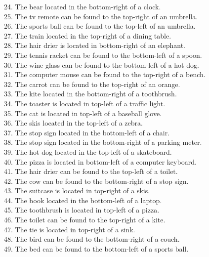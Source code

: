 \begin{figure}[t]
{\begin{minipage}{0.96\textwidth}
\begin{minipage}[t]{0.48\textwidth}
24. The bear located in the bottom-right of a clock.\\
25. The tv remote can be found to the top-right of an umbrella.\\
26. The sports ball can be found to the top-left of an umbrella.\\
27. The train located in the top-right of a dining table.\\
28. The hair drier is located in bottom-right of an elephant.\\
29. The tennis racket can be found to the bottom-left of a spoon.\\
30. The wine glass can be found to the bottom-left of a hot dog.\\
31. The computer mouse can be found to the top-right of a bench.\\
32. The carrot can be found to the top-right of an orange.\\
33. The kite located in the bottom-right of a toothbrush.\\
34. The toaster is located in top-left of a traffic light.\\
35. The cat is located in top-left of a baseball glove.\\
36. The skis located in the top-left of a zebra.\\
37. The stop sign located in the bottom-left of a chair.\\
38. The stop sign located in the bottom-right of a parking meter.\\
39. The hot dog located in the top-left of a skateboard.\\
40. The pizza is located in bottom-left of a computer keyboard.\\
41. The hair drier can be found to the top-left of a toilet.\\
42. The cow can be found to the bottom-right of a stop sign.\\
43. The suitcase is located in top-right of a skis.\\
44. The book located in the bottom-left of a laptop.\\
45. The toothbrush is located in top-left of a pizza.\\
46. The toilet can be found to the top-right of a kite.\\
47. The tie is located in top-right of a sink.\\
48. The bird can be found to the bottom-right of a couch.\\
49. The bed can be found to the bottom-left of a sports ball.\\

\end{minipage}
\end{minipage}}
\end{figure}
